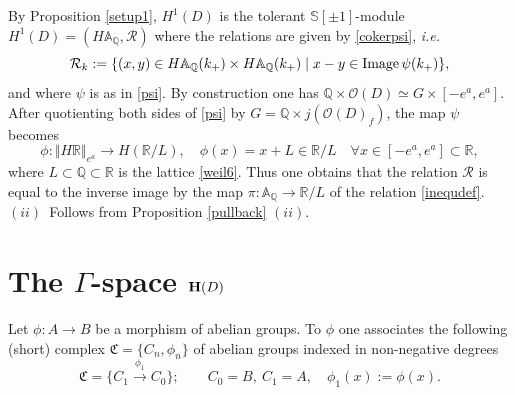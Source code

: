 \documentclass[cupthm]{CUP-JNL-JMJ}
\numberwithin{equation}{section}
\theoremstyle{cupplain}
\theoremstyle{cupdefinition}
\theoremstyle{cupremark}
\theoremstyle{cupproof}
\def\A{{\mathbb A}}
\def\Q{{\mathbb Q}}
\def\R{{\mathbb R}}
\def\S{{\mathbb S}}
\def\cO{{\mathcal O}}
\def\cR{{\mathcal R}}
\def\bfh{{\bf H}}
\def\sss{{\S}}
\def\spm{{\sss[\pm 1]}}
\newcommand{\ie}{{\it i.e.\/}\ }
\begin{document}
\begin{appendix}
\begin{equation}
\end{equation}
By Proposition \ref{setup1}, $H^1(D)$ is the tolerant  $\spm$-module $H^1(D) = (H\A_\Q, \cR)$ where the relations are given by \eqref{cokerpsi}, \ie
\[
 \cR_k:=\{ (x,y)\in H\A_\Q(k_+)\times  H\A_\Q(k_+)\mid x-y\in {\rm Image}\, \psi(k_+)\},
\]
and where $\psi$ is as in \eqref{psi}.
    By construction  one has $\Q\times \cO(D)\simeq G\times [-e^a,e^a]$.
  After quotienting both sides of \eqref{psi} by $G=\Q\times j(\cO(D)_f)$, the map $\psi$  becomes
 	 \begin{equation}\label{weil5}
\phi: \Vert H\R \Vert_{e^a}\to H(\R/L), \quad  \phi(x)=x+L \in \R/L\quad\forall x\in [-e^a,e^a]\subset \R,
\end{equation}
where $L\subset \Q\subset \R$ is the lattice \eqref{weil6}. Thus one obtains that the relation $\cR$ is equal to the inverse image by the map $\pi:\A_\Q\to \R/L$ of the relation \eqref{inequdef}.\newline
$(ii)$~Follows from Proposition \ref{pullback} $(ii)$.\endproof 



\section{The $\Gamma$-space $\bfh(D)$}\label{secB}

Let $\phi: A \to B$ be a morphism of abelian groups. To $\phi$ one associates  the following (short) complex  $\mathfrak C=\{C_n,\phi_n\}$ of abelian groups indexed in  non-negative degrees
\begin{equation}\label{short}
\mathfrak C=\{C_1\stackrel{\phi_1}{\to} C_0\};\qquad C_0=B, \ C_1=A, \quad \phi_1(x):=\phi(x).\end{equation}
 

\end{appendix}
\end{document}
